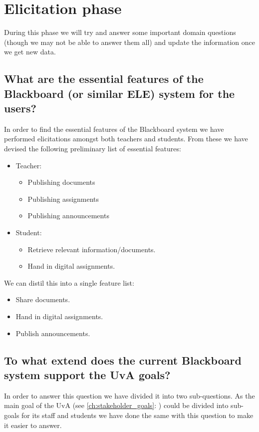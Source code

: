 \chapter{Elicitation phase}
During this phase we will try and answer some important domain questions (though we may not be able to answer them all) and update the information once we get new data.

\section{What are the essential features of the Blackboard (or similar ELE) system for the users?}
In order to find the essential features of the Blackboard system we have performed elicitations amongst both teachers and students. From these we have devised the following preliminary list of essential features:

\begin{itemize}
	\item Teacher:
	\begin{itemize}
		\item Publishing documents
		\item Publishing assignments
		\item Publishing announcements
	\end{itemize}
	
	\item Student:
	\begin{itemize}
		\item Retrieve relevant information/documents.
		\item Hand in digital assignments.
	\end{itemize}
\end{itemize}

We can distil this into a single feature list:
\begin{itemize}
	\item Share documents.
	\item Hand in digital assignments.
	\item Publish announcements.
\end{itemize}

\section{To what extend does the current Blackboard system support the UvA goals?} \label{uva_goal_question}
In order to answer this question we have divided it into two sub-questions. As the main goal of the UvA (see \ref{ch:stakeholder_goals}: ) could be divided into sub-goals for its staff and students we have done the same with this question to make it easier to answer.

